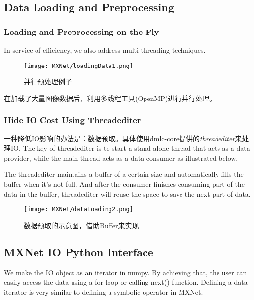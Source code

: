 \subsection{Data Loading and Preprocessing}

\subsubsection{Loading and Preprocessing on the Fly}

In service of efficiency, we also address multi-threading techniques. 

\begin{figure}[!hbtp]
\centering
\texttt{[image: MXNet/loadingData1.png]}
\caption{并行预处理例子}
\label{loadingData1}
\end{figure}

在加载了大量图像数据后，利用多线程工具(OpenMP)进行并行处理。

\subsubsection{Hide IO Cost Using Threadediter}

一种降低IO影响的办法是：数据预取。具体使用dmlc-core提供的\textit{threadediter}来处理IO. The key of threadediter is to start a stand-alone thread that acts as a data provider, while the main thread acts as a data consumer as illustrated below.

The threadediter maintains a buffer of a certain size and automatically fills the buffer when it’s not full. And after the consumer finishes consuming part of the data in the buffer, threadediter will reuse the space to save the next part of data. 

\begin{figure}[!hbtp]
\centering
\texttt{[image: MXNet/dataLoading2.png]}
\caption{数据预取的示意图，借助Buffer来实现}
\label{loadingData2}
\end{figure}


\subsection{MXNet IO Python Interface}

We make the IO object as an iterator in numpy. By achieving that, the user can easily access the data using a for-loop or calling next() function. Defining a data iterator is very similar to defining a symbolic operator in MXNet.

